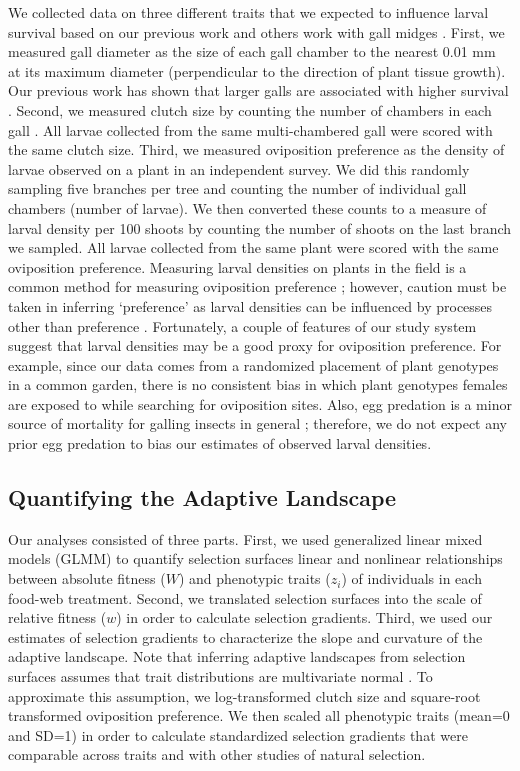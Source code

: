 \documentclass[11pt,]{article}
\begin{document}
We collected data on three different traits that we expected to
influence larval survival based on our previous work \citep{Barbour2016}
and others work with gall midges \citep{Weis1983, Heath2018}. First, we
measured gall diameter as the size of each gall chamber to the nearest
0.01 mm at its maximum diameter (perpendicular to the direction of plant
tissue growth). Our previous work has shown that larger galls are
associated with higher survival \citep{Barbour2016}. Second, we measured
clutch size by counting the number of chambers in each gall
\citep{Weis1983, Heath2018}. All larvae collected from the same
multi-chambered gall were scored with the same clutch size. Third, we
measured oviposition preference as the density of larvae observed on a
plant in an independent survey. We did this randomly sampling five
branches per tree and counting the number of individual gall chambers
(number of larvae). We then converted these counts to a measure of
larval density per 100 shoots by counting the number of shoots on the
last branch we sampled. All larvae collected from the same plant were
scored with the same oviposition preference. Measuring larval densities
on plants in the field is a common method for measuring oviposition
preference \citep{Gripenberg2010}; however, caution must be taken in
inferring `preference' as larval densities can be influenced by
processes other than preference \citep{Singer1986}. Fortunately, a
couple of features of our study system suggest that larval densities may
be a good proxy for oviposition preference. For example, since our data
comes from a randomized placement of plant genotypes in a common garden,
there is no consistent bias in which plant genotypes females are exposed
to while searching for oviposition sites. Also, egg predation is a minor
source of mortality for galling insects in general \citep{Hawkins1997};
therefore, we do not expect any prior egg predation to bias our
estimates of observed larval densities.

\subsection{Quantifying the Adaptive
Landscape}\label{quantifying-the-adaptive-landscape}

Our analyses consisted of three parts. First, we used generalized linear
mixed models (GLMM) to quantify selection surfaces \textemdash linear
and nonlinear relationships between absolute fitness (\(W\)) and
phenotypic traits (\(z_i\)) of individuals \textemdash in each food-web
treatment. Second, we translated selection surfaces into the scale of
relative fitness (\(w\)) in order to calculate selection gradients.
Third, we used our estimates of selection gradients to characterize the
slope and curvature of the adaptive landscape. Note that inferring
adaptive landscapes from selection surfaces assumes that trait
distributions are multivariate normal \citep{Lande1983}. To approximate
this assumption, we log-transformed clutch size and square-root
transformed oviposition preference. We then scaled all phenotypic traits
(mean=0 and SD=1) in order to calculate standardized selection gradients
that were comparable across traits and with other studies of natural
selection.
\end{document}
